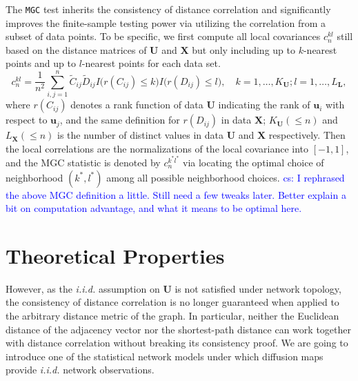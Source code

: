 \documentclass[11pt]{article}
\theoremstyle{definition}
\newcommand{\cs}[1]{\textcolor{blue}{cs: #1}}
\begin{document}
The \texttt{MGC} test inherits the consistency of distance correlation and significantly improves the finite-sample testing power via utilizing the correlation from a subset of data points. To be specific, we first compute all local covariances $c^{kl}_{n}$ still based on the distance matrices of $\mathbf{U}$ and $\mathbf{X}$ but only including up to $k$-nearest points and up to $l$-nearest points for each data set. 
\begin{equation}
\label{eq:MGC}
c^{kl}_{n} = \frac{1}{n^2} \sum\limits_{i,j=1}^{n} \tilde{C}_{ij} \tilde{D}_{ij} I\big( r(C_{ij}) \leq k \big) I\big(  r(D_{ij}) \leq l  \big), \quad k= 1, \ldots, K_{\mathbf{U}}; l =1, \ldots, L_{\mathbf{L}},
\end{equation}
where %
$r(C_{ij})$ denotes a rank function of data $\mathbf{U}$ indicating the rank of $\mathbf{u}_{i}$ with respect to $\mathbf{u}_{j}$, and the same definition for $r(D_{ij})$ in data $\mathbf{X}$; 
$K_{\mathbf{U}} (\leq n)$ and $L_{\mathbf{X}} (\leq n)$ is the number of distinct values in data $\mathbf{U}$ and $\mathbf{X}$ respectively. Then the local correlations are the normalizations of the local covariance into $[-1,1]$, and the MGC statistic is denoted by $c^{k^{*} l^{*}}_{n}$ via locating the optimal choice of neighborhood $(k^{*}, l^{*})$ among all possible neighborhood choices.
\cs{I rephrased the above MGC definition a little. Still need a few tweaks later. Better explain a bit on computation advantage, and what it means to be optimal here. }


\section{Theoretical Properties}
\label{sec:theory}

However, as the \textit{i.i.d.} assumption on $\mathbf{U}$ is not satisfied under network topology, the consistency of distance correlation is no longer guaranteed when applied to the arbitrary distance metric of the graph. In particular, neither the Euclidean distance of the adjacency vector nor the shortest-path distance can work together with distance correlation without breaking its consistency proof. We are going to introduce one of the statistical network models under which diffusion maps provide \textit{i.i.d.} network observations. 
\end{document}
